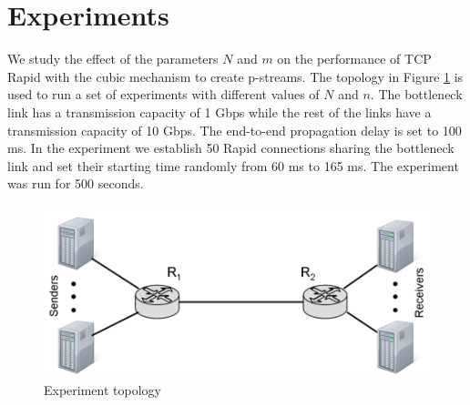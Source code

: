 \section{Experiments}
  We study the effect of the parameters $N$ and $m$ on the performance of 
  TCP Rapid with the cubic mechanism to create p-streams. The topology in 
  Figure \ref{topology} is used to run a set of experiments with different 
  values of $N$ and $n$. The bottleneck link has a transmission capacity of 
  1 Gbps while the rest of the links have a transmission capacity of 10 Gbps. 
  The end-to-end propagation delay is set to 100 ms. In the experiment we 
  establish 50 Rapid connections sharing the bottleneck link and set their 
  starting time randomly from 60 ms to 165 ms. The experiment was run for 
  500 seconds.
    \begin{figure}[h]
    \includegraphics[scale=0.38]{img/topology.png}
    \caption{Experiment topology}
    \label{topology}
  \end{figure}
